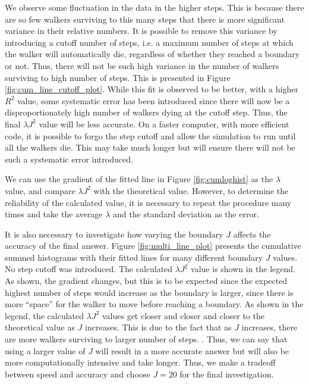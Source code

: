 \documentclass[journal]{IEEEtran}
\begin{document}
We observe some fluctuation in the data in the higher steps. This is because
there are so few walkers surviving to this many steps that there is more
significant variance in their relative numbers. It is possible to remove this
variance by introducing a cutoff number of steps, i.e. a maximum number of steps
at which the walker will automatically die, regardless of whether they reached a
boundary or not. Thus, there will not be such high variance in the number of
walkers surviving to high number of steps. This is presented in Figure
\ref{fig:cum_line_cutoff_plot}. While this fit is observed to be better, with a
higher $R^2$ value, some systematic error has been introduced since there will now
be a disproportionately high number of walkers dying at the cutoff step. Thus,
the final $\lambda J^2$ value will be less accurate. On a faster computer, with
more efficient code, it is possible to forgo the step cutoff and allow the
simulation to run until all the walkers die. This may take much longer but will
ensure there will not be such a systematic error introduced.

We can use the gradient of the fitted line in Figure \ref{fig:cumloghist} as the
$\lambda$ value, and compare $\lambda J^2$ with the theoretical value. However,
to determine the reliability of the calculated value, it is necessary to repeat
the procedure many times and take the average $\lambda$ and the standard
deviation as the error.

It is also necessary to investigate how varying the boundary $J$ affects the
accuracy of the final answer. Figure \ref{fig:multi_line_plot} presents the
cumulative summed histograms with their fitted lines for many different boundary
$J$ values. No step cutoff was introduced. The calculated $\lambda J^2$ value is
shown in the legend.  As shown, the gradient changes, but
this is to be expected since the expected highest number of steps would increase
as the boundary is larger, since there is more ``space'' for the walker to move
before reaching a boundary. As shown in the legend, the calculated $\lambda J^2$
values get closer and closer and closer to the theoretical value as $J$
increases. This is due to the fact that as $J$ increases, there are more walkers
surviving to larger number of steps. .
Thus, we can say that using a larger value of $J$ will result in a more
accurate answer but will also be more computationally intensive and take
longer. Thus, we make a tradeoff between speed and accuracy and choose $J=20$
for the final investigation.
\end{document}

